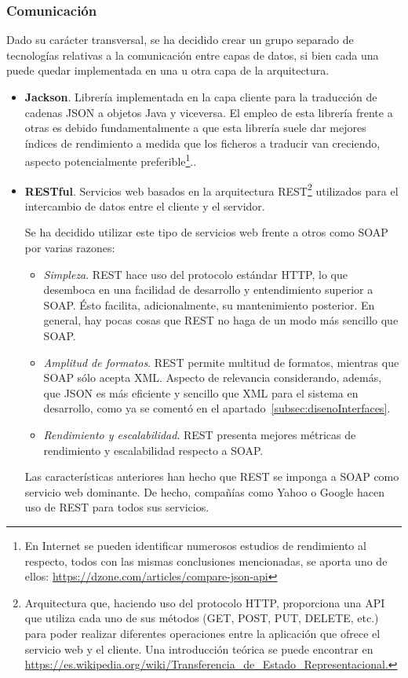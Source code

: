 \subsubsection{Comunicación}

Dado su carácter transversal, se ha decidido crear un grupo separado de tecnologías relativas a la comunicación entre capas de datos, si bien cada una puede quedar implementada en una u otra capa de la arquitectura.

\begin{itemize}
	\item{\textbf{Jackson}. Librería implementada en la capa cliente para la traducción de cadenas JSON a objetos Java y viceversa. El empleo de esta librería frente a otras es debido fundamentalmente a que esta librería suele dar mejores índices de rendimiento a medida que los ficheros a traducir van creciendo, aspecto potencialmente preferible\footnote{En Internet se pueden identificar numerosos estudios de rendimiento al respecto, todos con las mismas conclusiones mencionadas, se aporta uno de ellos: \url{https://dzone.com/articles/compare-json-api}}.}.
	
	\item{\textbf{RESTful}. Servicios web basados en la arquitectura REST\footnote{Arquitectura que, haciendo uso del protocolo HTTP, proporciona una API que utiliza cada uno de sus métodos (GET, POST, PUT, DELETE, etc.) para poder realizar diferentes operaciones entre la aplicación que ofrece el servicio web y el cliente. Una introducción teórica se puede encontrar en \url{https://es.wikipedia.org/wiki/Transferencia_de_Estado_Representacional.}} utilizados para el intercambio de datos entre el cliente y el servidor.
		
	Se ha decidido utilizar este tipo de servicios web frente a otros como SOAP por varias razones:
	\begin{itemize}
		\item \textit{Simpleza}. REST hace uso del protocolo estándar HTTP, lo que desemboca en una facilidad de desarrollo y entendimiento superior a SOAP. Ésto facilita, adicionalmente, su mantenimiento posterior. En general, hay pocas cosas que REST no haga de un modo más sencillo que SOAP. 
		\item \textit{Amplitud de formatos}. REST permite multitud de formatos, mientras que SOAP sólo acepta XML. Aspecto de relevancia considerando, además, que JSON es más eficiente y sencillo que XML para el sistema en desarrollo, como ya se comentó en el apartado~\ref{subsec:disenoInterfaces}.
		\item \textit{Rendimiento y escalabilidad}. REST presenta mejores métricas de rendimiento y escalabilidad respecto a SOAP.
	\end{itemize}
	Las características anteriores han hecho que REST se imponga a SOAP como servicio web dominante. De hecho, compañías como Yahoo o Google hacen uso de REST para todos sus servicios.}


\end{itemize}

